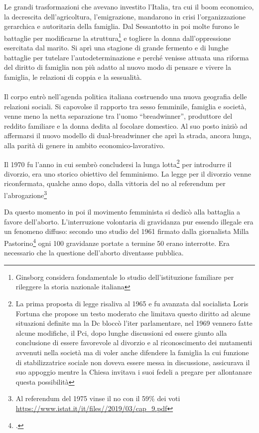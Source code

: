 Le grandi trasformazioni che avevano investito l'Italia, tra cui il boom economico, la decrescita dell'agricoltura, l'emigrazione, mandarono in crisi l'organizzazione gerarchica e autoritaria della famiglia.
Dal Sessantotto in poi molte furono le battaglie per modificarne la struttura\footnote{Ginsborg considera fondamentale lo studio dell'istituzione familiare per rileggere la storia nazionale italiana} e togliere la donna dall'oppressione esercitata dal marito.
Si aprì una stagione di grande fermento e di lunghe battaglie per tutelare l'autodeterminazione e perché venisse attuata una riforma del diritto di famiglia non più adatto al nuovo modo di pensare e vivere la famiglia, le relazioni di coppia e la sessualità.
\paragraph{}Il corpo entrò nell'agenda politica italiana costruendo una nuova geografia delle relazioni sociali.
Si capovolse il rapporto tra sesso femminile, famiglia e società, venne meno la netta separazione tra l'uomo \enquote{breadwinner}, produttore del reddito familiare e la donna dedita al focolare domestico.
Al suo posto iniziò ad affermarsi il nuovo modello di dual-breadwinner che aprì la strada, ancora lunga, alla parità di genere in ambito economico-lavorativo.

Il 1970 fu l'anno in cui sembrò concludersi la lunga lotta\footnote{La prima proposta di legge risaliva al 1965 e fu avanzata dal socialista Loris Fortuna che propose un testo moderato che limitava questo diritto ad alcune situazioni definite ma la Dc bloccò l'iter parlamentare, nel 1969 vennero fatte alcune modifiche, il Pci, dopo lunghe discussioni ed essere giunto alla conclusione di essere favorevole al divorzio e al riconoscimento dei mutamenti avvenuti nella società ma di voler anche difendere la famiglia la cui funzione di stabilizzatrice sociale non doveva essere messa in discussione, assicurava il suo appoggio mentre la Chiesa invitava i suoi fedeli a pregare per allontanare questa possibilità} per introdurre il divorzio, era uno storico obiettivo del femminismo.
La legge per il divorzio venne riconfermata, qualche anno dopo, dalla vittoria del no al referendum per l'abrogazione\footnote{Al referendum del 1975 vinse il no con il 59\% dei voti \url{https://www.istat.it/it/files//2019/03/cap_9.pdf}}

Da questo momento in poi il movimento femminista si dedicò alla battaglia a favore dell'aborto. L'interruzione volontaria di gravidanza pur essendo illegale era un fenomeno diffuso: secondo uno studio del 1961 firmato dalla giornalista Milla Pastorino\footcite{Pastorino} ogni 100 gravidanze portate a termine 50 erano interrotte.
Era necessario che la questione dell'aborto diventasse pubblica.

